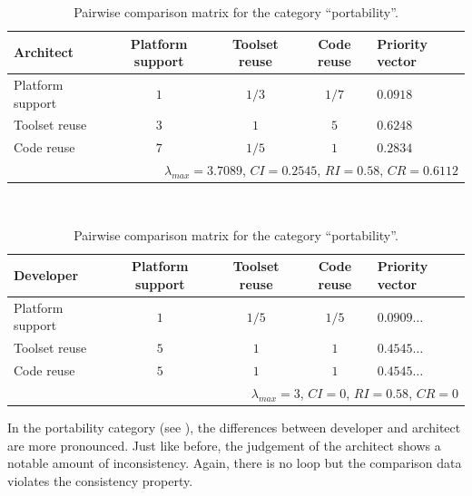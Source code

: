 
\begin{table}[h!]
    \begin{center}
        \begin{tabular}{lcccl}
            \hline
            \textbf{Architect}     & Platform support & Toolset reuse & Code reuse & Priority vector \\ 
            \hline
            Platform support         & $1$            & $1/3$         & $1/7$      & $0.0918$        \\
            Toolset reuse          & $3$            & $1$           & $5$        & $0.6248$        \\
            Code reuse             & $7$            & $1/5$         & $1$        & $0.2834$        \\
            \hline
            \multicolumn{5}{r}{$\lambda_{max} = 3.7089$, $CI = 0.2545$, $RI = 0.58$, $CR = 0.6112$}\\
            \hline
        \end{tabular}
        \\\vspace{1em}
        \begin{tabular}{lcccl}
            \hline
            \textbf{Developer}     & Platform support & Toolset reuse & Code reuse & Priority vector \\ 
            \hline
            Platform support         & $1$            & $1/5$         & $1/5$      & $0.0909\ldots$  \\
            Toolset reuse          & $5$            & $1$           & $1$        & $0.4545\ldots$  \\
            Code reuse             & $5$            & $1$           & $1$        & $0.4545\ldots$  \\
            \hline
            \multicolumn{5}{r}{$\lambda_{max} = 3$, $CI = 0$, $RI = 0.58$, $CR = 0$}               \\
            \hline
        \end{tabular}
        \caption{Pairwise comparison matrix for the category ``portability''.}
        \label{tab:portability}
    \end{center}
\end{table}

In the portability category (see ), the differences between developer and architect are more pronounced. Just like before, the judgement of the architect shows a notable amount of inconsistency. Again, there is no loop but the comparison data violates the consistency property.

